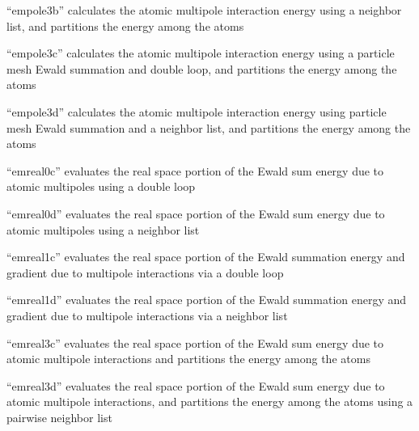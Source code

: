 \documentclass[letterpaper,11pt,english]{sphinxmanual}
\begin{document}
\sphinxAtStartPar
{}

\sphinxAtStartPar
“empole3b” calculates the atomic multipole interaction energy using a neighbor list, and partitions the energy among the atoms

\sphinxAtStartPar
{}

\sphinxAtStartPar
“empole3c” calculates the atomic multipole interaction energy using a particle mesh Ewald summation and double loop, and partitions the energy among the atoms

\sphinxAtStartPar
{}

\sphinxAtStartPar
“empole3d” calculates the atomic multipole interaction energy using particle mesh Ewald summation and a neighbor list, and partitions the energy among the atoms

\sphinxAtStartPar
{}

\sphinxAtStartPar
“emreal0c” evaluates the real space portion of the Ewald sum energy due to atomic multipoles using a double loop

\sphinxAtStartPar
{}

\sphinxAtStartPar
“emreal0d” evaluates the real space portion of the Ewald sum energy due to atomic multipoles using a neighbor list

\sphinxAtStartPar
{}

\sphinxAtStartPar
“emreal1c” evaluates the real space portion of the Ewald summation energy and gradient due to multipole interactions via a double loop

\sphinxAtStartPar
{}

\sphinxAtStartPar
“emreal1d” evaluates the real space portion of the Ewald summation energy and gradient due to multipole interactions via a neighbor list

\sphinxAtStartPar
{}

\sphinxAtStartPar
“emreal3c” evaluates the real space portion of the Ewald sum energy due to atomic multipole interactions and partitions the energy among the atoms

\sphinxAtStartPar
{}

\sphinxAtStartPar
“emreal3d” evaluates the real space portion of the Ewald sum energy due to atomic multipole interactions, and partitions the energy among the atoms using a pairwise neighbor list
\end{document}
